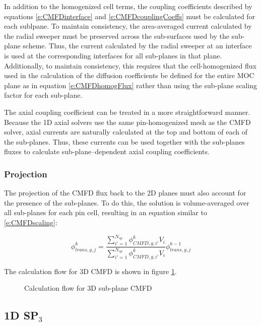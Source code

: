 In addition to the homogenized cell terms, the coupling coefficients described by equations \ref{e:CMFDinterface} and \ref{e:CMFDcouplingCoeffs} must be calculated for each sublpane.  To maintain consistency, the area-averaged current calculated by the radial sweeper must be preserved across the sub-surfaces used by the sub-plane scheme.  Thus, the current calculated by the radial sweeper at an interface is used at the corresponding interfaces for all sub-planes in that plane.  Additionally, to maintain consistency, this requires that the cell-homogenized flux used in the calculation of the diffusion coefficients be defined for the entire MOC plane as in equation \ref{e:CMFDhomogFlux} rather than using the sub-plane scaling factor for each sub-plane.

The axial coupling coefficient can be treated in a more straightforward manner.  Because the 1D axial solvers use the same pin-homogenized mesh as the CMFD solver, axial currents are naturally calculated at the top and bottom of each of the sub-planes.  Thus, these currents can be used together with the sub-planes fluxes to calculate sub-plane--dependent axial coupling coefficients.

\subsubsection{Projection}

The projection of the CMFD flux back to the 2D planes must also account for the presence of the sub-planes.  To do this, the solution is volume-averaged over all sub-planes for each pin cell, resulting in an equation similar to \ref{e:CMFDscaling}:

\begin{equation}
\phi_{trans,g,j}^k = \frac{\sum_{i'=1}^{N_{sp}} \phi_{CMFD,g,i'}^k V_i}{\sum_{i'=1}^{N_{sp}} \phi_{CMFD,g,i'}^k V_i} \phi_{trans,g,j}^{k-1}
\end{equation}

The calculation flow for 3D CMFD is shown in figure \ref{f:CMFD-flowchart}.

\begin{figure}[h]
  \centering
  
  \caption{Calculation flow for 3D sub-plane CMFD}\label{f:CMFD-flowchart}
\end{figure}

\subsection{1D SP$_3$}

